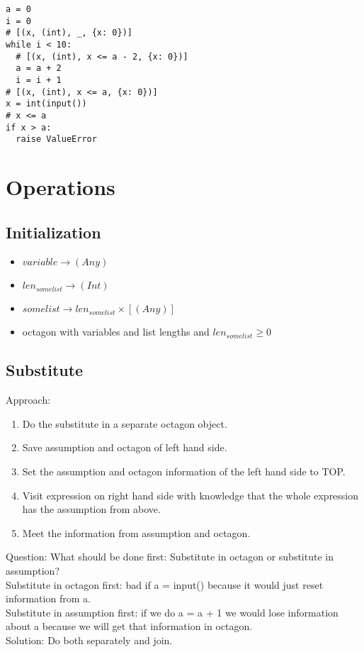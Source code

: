 \documentclass[11pt]{article}
\begin{document}
\begin{lstlisting}
a = 0
i = 0
# [(x, (int), _, {x: 0})]
while i < 10:
  # [(x, (int), x <= a - 2, {x: 0})]
  a = a + 2
  i = i + 1
# [(x, (int), x <= a, {x: 0})]
x = int(input())
# x <= a
if x > a:
  raise ValueError
\end{lstlisting}


\section{Operations}

\subsection{Initialization}


\begin{itemize}
  \item $variable \rightarrow (Any)$
  \item $len_{somelist} \rightarrow (Int)$
  \item $somelist \rightarrow len_{somelist} \times [(Any)]$
  \item octagon with variables and list lengths and $len_{somelist} \geq 0$
\end{itemize}

\subsection{Substitute}

Approach:
\begin{enumerate}
  \item Do the substitute in a separate octagon object.
  \item Save assumption and octagon of left hand side.
  \item Set the assumption and octagon information of the left hand side to TOP.
  \item Visit expression on right hand side with knowledge that the whole expression has the assumption from above.
  \item Meet the information from assumption and octagon.
\end{enumerate}

Question: What should be done first: Substitute in octagon or substitute in assumption?\\
Substitute in octagon first: bad if a = input() because it would just reset information from a.\\
Substitute in assumption first: if we do a = a + 1 we would lose information about a because we will get that information in octagon.\\
Solution: Do both separately and join.
\end{document}
